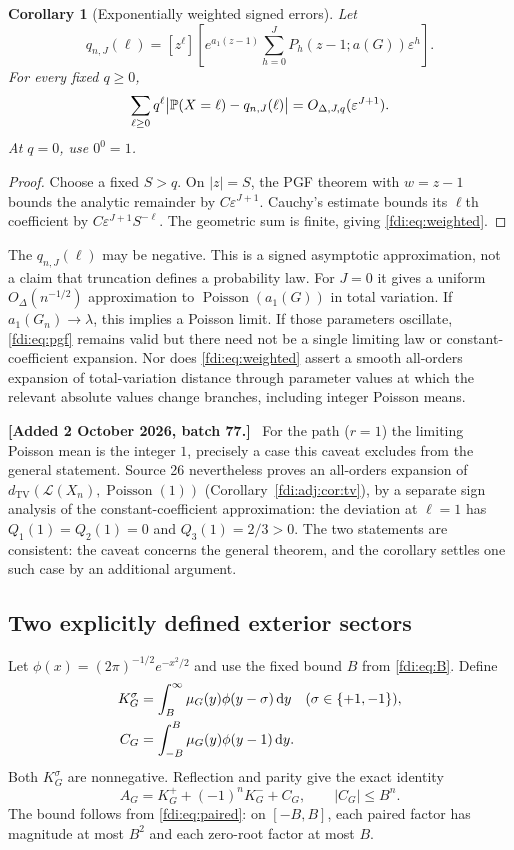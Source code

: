 \documentclass[11pt,letterpaper]{article}
\newtheorem{corollary}[theorem]{Corollary}
\theoremstyle{remark}\newtheorem{remark}[theorem]{Remark}
\newcommand{\eps}{\varepsilon}\newcommand{\Pois}{\operatorname{Poisson}}
\newcommand{\dd}{\,\mathrm d}\newcommand{\N}{\mathbb N}
\newcommand{\TV}{d_{\mathrm{TV}}}
\newenvironment{mergenote}[1][2 October 2026, batch 77]{\par\smallskip\begingroup\small\noindent\textbf{[Added #1.]}\ }{\endgroup\par\smallskip}
\begin{document}
\begin{corollary}[Exponentially weighted signed errors]\label{fdi:cor:weighted}
Let
\[
 q_{n,J}(\ell)=[z^\ell]\left[e^{a_1(z-1)}
 \sum_{h=0}^J P_h(z-1;a(G))\eps^h\right].
\]
For every fixed $q\ge0$,
\begin{equation}\label{fdi:eq:weighted}
 \sum_{\ell\ge0}q^\ell\big|\Prb(X=\ell)-q_{n,J}(\ell)\big|
 =O_{\Delta,J,q}(\eps^{J+1}).
\end{equation}
At $q=0$, use $0^0=1$.
\end{corollary}
\begin{proof}
Choose a fixed $S>q$. On $|z|=S$, the PGF theorem with $w=z-1$ bounds the analytic remainder by $C\eps^{J+1}$. Cauchy's estimate bounds its $\ell$th coefficient by $C\eps^{J+1}S^{-\ell}$. The geometric sum is finite, giving \eqref{fdi:eq:weighted}.
\end{proof}
The $q_{n,J}(\ell)$ may be negative. This is a signed asymptotic approximation, not a claim that truncation defines a probability law. For $J=0$ it gives a uniform $O_\Delta(n^{-1/2})$ approximation to $\Pois(a_1(G))$ in total variation. If $a_1(G_n)\to\lambda$, this implies a Poisson limit. If those parameters oscillate, \eqref{fdi:eq:pgf} remains valid but there need not be a single limiting law or constant-coefficient expansion. Nor does \eqref{fdi:eq:weighted} assert a smooth all-orders expansion of total-variation distance through parameter values at which the relevant absolute values change branches, including integer Poisson means.

\begin{mergenote}
For the path ($r=1$) the limiting Poisson mean is the integer $1$, precisely a case this caveat excludes from the general statement. Source 26 nevertheless proves an all-orders expansion of $\TV(\mathcal L(X_n),\Pois(1))$ (Corollary~\ref{fdi:adj:cor:tv}), by a separate sign analysis of the constant-coefficient approximation: the deviation at $\ell=1$ has $Q_1(1)=Q_2(1)=0$ and $Q_3(1)=2/3>0$. The two statements are consistent: the caveat concerns the general theorem, and the corollary settles one such case by an additional argument.
\end{mergenote}

\subsection{Two explicitly defined exterior sectors}
Let $\phi(x)=(2\pi)^{-1/2}e^{-x^2/2}$ and use the fixed bound $B$ from \eqref{fdi:eq:B}. Define
\begin{align}
 K_G^\sigma&=\int_B^\infty\mu_G(y)\phi(y-\sigma)\dd y
 \quad(\sigma\in\{+1,-1\}),\label{fdi:eq:K}\\
 C_G&=\int_{-B}^B\mu_G(y)\phi(y-1)\dd y.\notag
\end{align}
Both $K_G^\sigma$ are nonnegative. Reflection and parity give the exact identity
\begin{equation}\label{fdi:eq:split}
 A_G=K_G^+ +(-1)^nK_G^-+C_G,\qquad |C_G|\le B^n.
\end{equation}
The bound follows from \eqref{fdi:eq:paired}: on $[-B,B]$, each paired factor has magnitude at most $B^2$ and each zero-root factor at most $B$.
\end{document}
